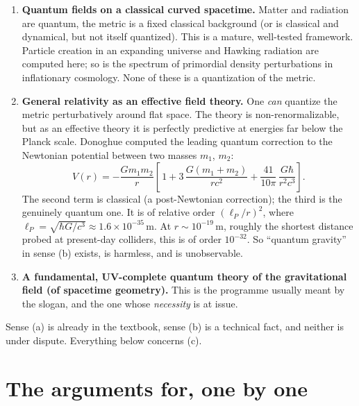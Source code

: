 \begin{enumerate}
\item[(a)] \textbf{Quantum fields on a classical curved spacetime.} Matter and
  radiation are quantum, the metric is a fixed classical background (or
  is classical and dynamical, but not itself quantized). This is a
  mature, well-tested framework. Particle creation in an expanding
  universe and Hawking radiation are computed here; so is the spectrum of
  primordial density perturbations in inflationary cosmology. None of
  these is a quantization of the metric.

\item[(b)] \textbf{General relativity as an effective field theory.} One
  \emph{can} quantize the metric perturbatively around flat space. The
  theory is non-renormalizable, but as an effective theory it is
  perfectly predictive at energies far below the Planck scale. Donoghue
  \cite{qg:donoghue} computed the leading quantum correction to the
  Newtonian potential between two masses $m_1$, $m_2$:
  \begin{equation}
    V(r) = -\frac{G m_1 m_2}{r}
    \left[\, 1 + 3\,\frac{G(m_1+m_2)}{r c^2}
      + \frac{41}{10\pi}\,\frac{G\hbar}{r^2 c^3} \right].
    \label{eq:donoghue}
  \end{equation}
  The second term is classical (a post-Newtonian correction); the third is
  the genuinely quantum one. It is of relative order
  $(\ell_P/r)^2$, where $\ell_P=\sqrt{\hbar G/c^3}\approx 1.6\times
  10^{-35}\,\mathrm{m}$. At $r\sim 10^{-19}\,\mathrm{m}$, roughly the
  shortest distance probed at present-day colliders, this is of order
  $10^{-32}$. So ``quantum gravity'' in sense (b) exists, is harmless, and
  is unobservable.

\item[(c)] \textbf{A fundamental, UV-complete quantum theory of the
  gravitational field (of spacetime geometry).} This is the programme
  usually meant by the slogan, and the one whose \emph{necessity} is at
  issue.
\end{enumerate}

Sense (a) is already in the textbook, sense (b) is a technical fact, and
neither is under dispute. Everything below concerns (c).

\section{The arguments for, one by one}

